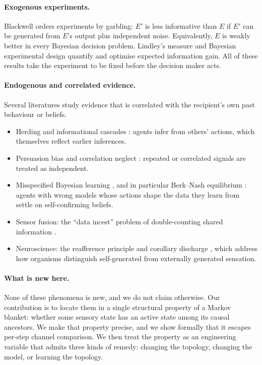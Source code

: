 \documentclass[11pt]{article}
\theoremstyle{definition}
\theoremstyle{remark}
\begin{document}
\paragraph{Exogenous experiments.} Blackwell \citep{blackwell1953} orders
experiments by garbling: $E'$ is less informative than $E$ if $E'$ can be
generated from $E$'s output plus independent noise. Equivalently, $E$ is weakly
better in every Bayesian decision problem. Lindley's measure
\citep{lindley1956} and Bayesian experimental design \citep{chaloner1995}
quantify and optimise expected information gain. All of these results take the
experiment to be fixed before the decision maker acts.

\paragraph{Endogenous and correlated evidence.} Several literatures study
evidence that is correlated with the recipient's own past behaviour or beliefs.
\begin{itemize}
\item Herding and informational cascades
      \citep{banerjee1992,bikhchandani1992}: agents infer from others' actions,
      which themselves reflect earlier inferences.
\item Persuasion bias \citep{demarzo2003} and correlation neglect
      \citep{enke2019}: repeated or correlated signals are treated as
      independent.
\item Misspecified Bayesian learning \citep{berk1966}, and in particular
      Berk--Nash equilibrium \citep{esponda2016}: agents with wrong models whose
      actions shape the data they learn from settle on self-confirming beliefs.
\item Sensor fusion: the ``data incest'' problem of double-counting shared
      information \citep{julier1997}.
\item Neuroscience: the reafference principle and corollary discharge
      \citep{vonholst1950}, which address how organisms distinguish
      self-generated from externally generated sensation.
\end{itemize}

\paragraph{What is new here.} None of these phenomena is new, and we do not
claim otherwise. Our contribution is to locate them in a single structural
property of a Markov blanket: whether some sensory state has an active state
among its causal ancestors. We make that property precise, and we show formally
that it escapes per-step channel comparison. We then treat the property as an
engineering variable that admits three kinds of remedy: changing the topology,
changing the model, or learning the topology.
\end{document}
